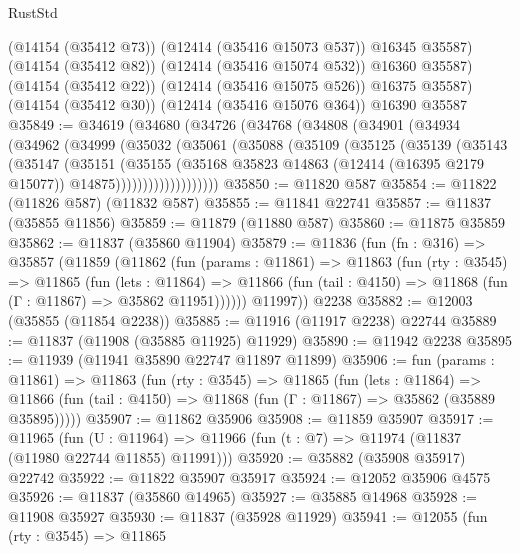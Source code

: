 \begin{lexlean}{RustStd}
\begin{coremodule}
          (@14154 (@35412 @73))
          (@12414 (@35416 @15073 @537))
          @16345
          @35587)
        (@14154 (@35412 @82))
        (@12414 (@35416 @15074 @532))
        @16360
        @35587)
      (@14154 (@35412 @22))
      (@12414 (@35416 @15075 @526))
      @16375
      @35587)
    (@14154 (@35412 @30))
    (@12414 (@35416 @15076 @364))
    @16390
    @35587
@35849 := @34619
    (@34680
      (@34726
        (@34768
          (@34808
            (@34901
              (@34934
                (@34962
                  (@34999
                    (@35032
                      (@35061
                        (@35088
                          (@35109
                            (@35125
                              (@35139
                                (@35143
                                  (@35147
                                    (@35151
                                      (@35155
                                        (@35168
                                          @35823
                                          @14863
                                          (@12414 (@16395 @2179 @15077))
                                          @14875)))))))))))))))))))
@35850 := @11820 @587
@35854 := @11822 (@11826 @587) (@11832 @587)
@35855 := @11841 @22741
@35857 := @11837 (@35855 @11856)
@35859 := @11879 (@11880 @587)
@35860 := @11875 @35859
@35862 := @11837 (@35860 @11904)
@35879 := @11836
    (fun (fn : @316) =>
    @35857
      (@11859
        (@11862
          (fun (params : @11861) =>
          @11863
            (fun (rty : @3545) =>
            @11865
              (fun (lets : @11864) =>
              @11866 (fun (tail : @4150) => @11868 (fun (Γ : @11867) => @35862 @11951))))))
        @11997))
    @2238
@35882 := @12003 (@35855 (@11854 @2238))
@35885 := @11916 (@11917 @2238) @22744
@35889 := @11837 (@11908 (@35885 @11925) @11929)
@35890 := @11942 @2238
@35895 := @11939 (@11941 @35890 @22747 @11897 @11899)
@35906 := fun (params : @11861) =>
  @11863
    (fun (rty : @3545) =>
    @11865
      (fun (lets : @11864) =>
      @11866 (fun (tail : @4150) => @11868 (fun (Γ : @11867) => @35862 (@35889 @35895)))))
@35907 := @11862 @35906
@35908 := @11859 @35907
@35917 := @11965
    (fun (U : @11964) => @11966 (fun (t : @7) => @11974 (@11837 (@11980 @22744 @11855) @11991)))
@35920 := @35882 (@35908 @35917) @22742
@35922 := @11822 @35907 @35917
@35924 := @12052 @35906 @4575
@35926 := @11837 (@35860 @14965)
@35927 := @35885 @14968
@35928 := @11908 @35927
@35930 := @11837 (@35928 @11929)
@35941 := @12055
    (fun (rty : @3545) =>
    @11865

\end{coremodule}
\end{lexlean}
